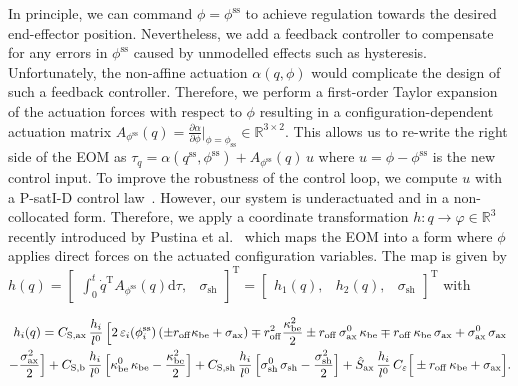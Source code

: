 In principle, we can command $\phi = \phi^\mathrm{ss}$ to achieve regulation towards the desired end-effector position.
Nevertheless, we add a feedback controller to compensate for any errors in $\phi^\mathrm{ss}$ caused by unmodelled effects such as hysteresis. Unfortunately, the non-affine actuation $\alpha(q,\phi)$ would complicate the design of such a feedback controller.
Therefore, we perform a first-order Taylor expansion of the actuation forces with respect to $\phi$ resulting in a configuration-dependent actuation matrix $A_{\phi^\mathrm{ss}}(q) = \frac{\partial \alpha}{\partial \phi} \big|_{\phi = \phi_\mathrm{ss}} \in \mathbb{R}^{3 \times 2}$. This allows us to re-write the right side of the \gls{EOM} as $\tau_q = \alpha(q^\mathrm{ss}, \phi^\mathrm{ss}) + A_{\phi^\mathrm{ss}}(q) \, u$ where $u = \phi - \phi^\mathrm{ss}$ is the new control input.
To improve the robustness of the control loop, we compute $u$ with a P-satI-D control law~\cite{pustina2022p}. However, our system is underactuated and in a non-collocated form.
Therefore, we apply a coordinate transformation $h: q \rightarrow \varphi \in \mathbb{R}^3$ recently introduced by Pustina et al.~\cite{pustina2024input} which maps the \gls{EOM} into a form where $\phi$ applies direct forces on the actuated configuration variables. The map is given by { $h(q) = \begin{bmatrix}
    \int_0^t \dot{q}^\mathrm{T} A_{\phi^\mathrm{ss}}(q) \mathrm{d}\tau, & \sigma_\mathrm{sh}
\end{bmatrix}^\mathrm{T} = \begin{bmatrix}
    h_1(q), & h_2(q), & \sigma_\mathrm{sh}
\end{bmatrix}^\mathrm{T}$}
with
\begin{footnotesize}
\begin{multline}\footnotesize
    h_i(q) = 
    C_{\mathrm{S},\mathrm{ax}} \, \frac{h_i}{l^0} \, \Big [ 2 \, \varepsilon_i(\phi^\mathrm{ss}_i) \left ( \pm r_\mathrm{off} \kappa_\mathrm{be} + \sigma_\mathrm{ax} \right ) \mp r_\mathrm{off}^2 \frac{\kappa_\mathrm{be}^2}{2} \pm r_\mathrm{off} \, \sigma_\mathrm{ax}^0 \, \kappa_\mathrm{be} \mp r_\mathrm{off} \, \kappa_\mathrm{be} \, \sigma_\mathrm{ax} + \sigma_\mathrm{ax}^0 \, \sigma_\mathrm{ax}\\ - \frac{\sigma_\mathrm{ax}^2}{2} \Big ] 
    + C_{\mathrm{S},\mathrm{b}} \, \frac{h_i}{l^0} \, \Big [ \kappa_\mathrm{be}^0 \, \kappa_\mathrm{be} - \frac{\kappa_\mathrm{be}^2}{2} \Big ] 
    + C_{\mathrm{S},\mathrm{sh}} \, \frac{h_i}{l^0} \, \Big [\sigma_\mathrm{sh}^0 \, \sigma_\mathrm{sh} - \frac{\sigma_\mathrm{sh}^2}{2} \Big ]
    + \hat{S}_\mathrm{ax} \, \frac{h_i}{l^0} \, C_\varepsilon \Big [ \pm r_\mathrm{off} \, \kappa_\mathrm{be} + \sigma_\mathrm{ax} \Big ].
\end{multline}
\end{footnotesize}
